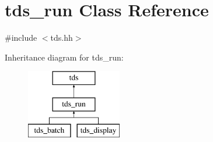 \hypertarget{classtds__run}{\section{tds\-\_\-run Class Reference}
\label{classtds__run}
}


{\ttfamily \#include $<$tds.\-hh$>$}

Inheritance diagram for tds\-\_\-run\-:\begin{figure}[H]
\begin{center}
\leavevmode
\includegraphics[height=3.000000cm]{classtds__run}
\end{center}
\end{figure}
